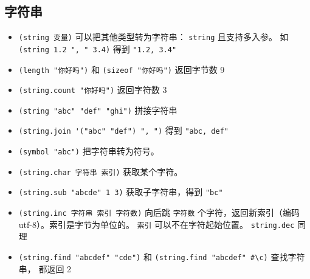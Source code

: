 \subsection{字符串}
\begin{itemize}
\item \verb`(string 变量)` 可以把其他类型转为字符串： \verb`string` 且支持多入参。 如 \verb`(string 1.2 ", " 3.4)` 得到 \verb`"1.2, 3.4"`
\item \verb`(length "你好吗")` 和 \verb`(sizeof "你好吗")` 返回字节数 9
\item \verb`(string.count "你好吗")` 返回字符数 3
\item \verb`(string "abc" "def" "ghi")` 拼接字符串
\item \verb`(string.join '("abc" "def") ", ")` 得到 \verb`"abc, def"`
\item \verb`(symbol "abc")` 把字符串转为符号。
\item \verb`(string.char 字符串 索引)` 获取某个字符。
\item \verb`(string.sub "abcde" 1 3)` 获取子字符串，得到 \verb`"bc"`
\item \verb`(string.inc 字符串 索引 字符数)` 向后跳 \verb`字符数` 个字符，返回新索引（编码 utf-8）。索引是字节为单位的。 \verb`索引` 可以不在字符起始位置。 \verb`string.dec` 同理
\item \verb`(string.find "abcdef" "cde")` 和 \verb`(string.find "abcdef" #\c)` 查找字符串， 都返回 2
\end{itemize}


